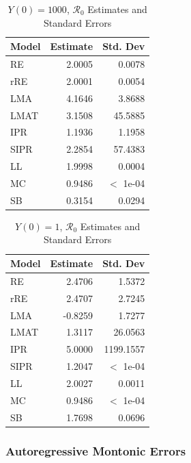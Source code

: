 \documentclass[12pt]{article}
\newcommand{\rr}{\ensuremath{\mathcal{R}_0}}
\begin{document}
\begin{table}[H]
	
	\centering
	\begin{tabular}[t]{l|r|r}
		\hline
		Model & Estimate & Std. Dev\\
		\hline
		RE & 2.0005 & 0.0078\\
		\hline
		rRE & 2.0001 & 0.0054\\
		\hline
		LMA & 4.1646 & 3.8688\\
		\hline
		LMAT & 3.1508 & 45.5885\\
		\hline
		IPR & 1.1936 & 1.1958\\
		\hline
		SIPR & 2.2854 & 57.4383\\
		\hline
		LL & 1.9998 & 0.0004\\
		\hline
		MC & 0.9486 & $<$ 1e-04\\
		\hline
		SB & 0.3154 & 0.0294\\
		\hline
	\end{tabular}
	\caption{$Y(0) = 1000$, $\rr$ Estimates and Standard Errors}
\end{table}

\begin{table}[H]
	
	\centering
	\begin{tabular}[t]{l|r|r}
		\hline
		Model & Estimate & Std. Dev\\
		\hline
		RE & 2.4706 & 1.5372\\
		\hline
		rRE & 2.4707 & 2.7245\\
		\hline
		LMA & -0.8259 & 1.7277\\
		\hline
		LMAT & 1.3117 & 26.0563\\
		\hline
		IPR & 5.0000 & 1199.1557\\
		\hline
		SIPR & 1.2047 & $<$ 1e-04\\
		\hline
		LL & 2.0027 & 0.0011\\
		\hline
		MC & 0.9486 & $<$ 1e-04\\
		\hline
		SB & 1.7698 & 0.0696\\
		\hline
	\end{tabular}
	\caption{$Y(0) = 1$, $\rr$ Estimates and Standard Errors}
\end{table}

\subsubsection{Autoregressive Montonic Errors}
\end{document}
